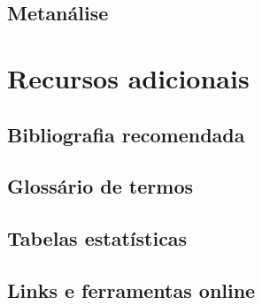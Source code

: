 \documentclass[
]{book}
\begin{document}
\section{Metanálise}\label{metanuxe1lise}

\chapter{Recursos adicionais}\label{recursos-adicionais}

\section{Bibliografia recomendada}\label{bibliografia-recomendada}

\section{Glossário de termos}\label{glossuxe1rio-de-termos}

\section{Tabelas estatísticas}\label{tabelas-estatuxedsticas}

\section{Links e ferramentas online}\label{links-e-ferramentas-online}
\end{document}

